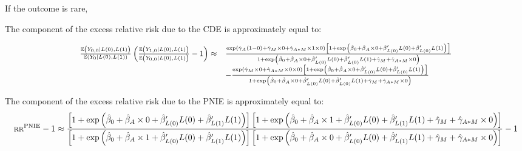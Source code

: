 \documentclass[
]{book}
\begin{document}
If the outcome is rare,

The component of the excess relative risk due to the CDE is approximately equal to:

\[\small
\begin{array}{rl}
\frac{\mathbb{E}\left( Y_{0,0} \mid L(0), L(1) \right)}{\mathbb{E}\left( Y_0 \mid L(0), L(1) \right)} \left(\frac{\mathbb{E}\left(Y_{1,0} \mid L(0),L(1) \right)}{\mathbb{E}\left(Y_{0,0} \mid L(0),L(1)\right)} - 1\right) \approx & \frac{\exp \left( \hat{\gamma}_A(1-0) + \hat{\gamma}_M \times 0 + \hat{\gamma}_{A \ast M} \times 1 \times 0 \right) \left[ 1 + \exp \left( \hat{\beta}_0 + \hat{\beta}_A \times 0 + \hat{\beta}_{L(0)}^\prime L(0) + \hat{\beta}_{L(0)}^\prime L(1) \right) \right]}{1 + \exp \left( \hat{\beta}_0 + \hat{\beta}_A \times 0 + \hat{\beta}_{L(0)}^\prime L(0) + \hat{\beta}_{L(0)}^\prime L(1) + \hat{\gamma}_M + \hat{\gamma}_{A \ast M} \times 0\right)} \\
& - \frac{\exp \left( \hat{\gamma}_M \times 0 + \hat{\gamma}_{A \ast M} \times 0 \times 0\right) \left[ 1 + \exp \left( \hat{\beta}_0 + \hat{\beta}_A \times 0 + \hat{\beta}_{L(0)}^\prime L(0) + \hat{\beta}_{L(0)}^\prime L(1) \right) \right]}{1 + \exp \left( \hat{\beta}_0 + \hat{\beta}_A \times 0 + \hat{\beta}_{L(0)}^\prime L(0) + \hat{\beta}_{L(0)}^\prime L(1) + \hat{\gamma}_M + \hat{\gamma}_{A \ast M} \times 0 \right)} 
\end{array}\]

The component of the excess relative risk due to the PNIE is approximately equal to:
\[\scriptsize
\text{RR}^\text{PNIE} - 1 \approx \frac{\left[ 1 + \exp \left( \hat{\beta}_0 + \hat{\beta}_A \times 0 + \hat{\beta}_{L(0)}^\prime L(0) + \hat{\beta}_{L(1)}^\prime L(1) \right) \right] \left[ 1 + \exp \left( \hat{\beta}_0 + \hat{\beta}_A \times 1 + \hat{\beta}_{L(0)}^\prime L(0) + \hat{\beta}_{L(1)}^\prime L(1) + \hat{\gamma}_M + \hat{\gamma}_{A \ast M} \times 0 \right) \right]}{\left[ 1 + \exp \left( \hat{\beta}_0 + \hat{\beta}_A \times 1 + \hat{\beta}_{L(0)}^\prime L(0) + \hat{\beta}_{L(1)}^\prime L(1) \right) \right] \left[ 1 + \exp \left( \hat{\beta}_0 + \hat{\beta}_A \times 0 + \hat{\beta}_{L(0)}^\prime L(0) + \hat{\beta}_{L(1)}^\prime L(1) + \hat{\gamma}_M + \hat{\gamma}_{A \ast M} \times 0 \right) \right] } - 1 \]
\end{document}

